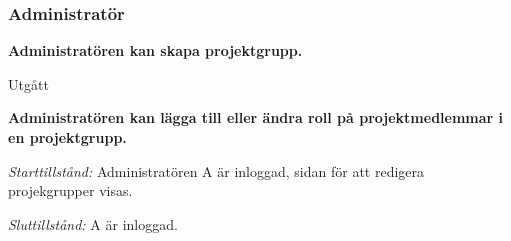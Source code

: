 \documentclass[a4paper]{article}
\begin{document}
\subsubsection{Administratör}

\begin{ST}

\item
\textbf{Administratören kan skapa projektgrupp.}

Utgått




\item
\textbf{Administratören kan lägga till eller ändra roll på projektmedlemmar i en projektgrupp.}

\emph{Starttillstånd:} Administratören A är inloggad, sidan för att redigera projekgrupper visas.

\emph{Sluttillstånd:} A är inloggad.


\end{ST}
\end{document}
